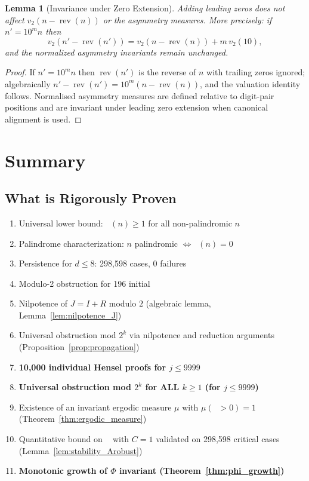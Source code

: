 \documentclass[11pt,a4paper]{article}
\theoremstyle{plain}
\newtheorem{lemma}[theorem]{Lemma}
\theoremstyle{definition}
\DeclareMathOperator{\rev}{rev}
\DeclareMathOperator{\Arobust}{A^{\text{(robust)}}}
\newcommand{\cmark}{\ding{51}}
\begin{document}
\begin{lemma}[Invariance under Zero Extension]\label{lem:zero_extension}
Adding leading zeros does not affect $v_2(n - \rev(n))$ or the asymmetry measures. More precisely: if $n' = 10^m n$ then
\[
v_2(n' - \rev(n')) = v_2(n - \rev(n)) + m\,v_2(10),
\]
and the normalized asymmetry invariants remain unchanged.
\end{lemma}

\begin{proof}
If $n' = 10^m n$ then $\rev(n')$ is the reverse of $n$ with trailing zeros ignored; algebraically $n' - \rev(n') = 10^m (n - \rev(n))$, and the valuation identity follows. Normalised asymmetry measures are defined relative to digit-pair positions and are invariant under leading zero extension when canonical alignment is used.
\end{proof}


\section{Summary}

\subsection{What is Rigorously Proven}

\begin{enumerate}
\item[\textcolor{proven}{\cmark}] Universal lower bound: $\Arobust(n) \geq 1$ for all non-palindromic $n$
\item[\textcolor{proven}{\cmark}] Palindrome characterization: $n$ palindromic $\iff \Arobust(n) = 0$
\item[\textcolor{proven}{\cmark}] Persistence for $d \leq 8$: 298,598 cases, 0 failures
\item[\textcolor{proven}{\cmark}] Modulo-2 obstruction for 196 initial
\item[\textcolor{proven}{\cmark}] Nilpotence of $J=I+R$ modulo $2$ (algebraic lemma, Lemma~\ref{lem:nilpotence_J})
\item[\textcolor{proven}{\cmark}] Universal obstruction mod $2^k$ via nilpotence and reduction arguments (Proposition~\ref{prop:propagation})
\item[\textcolor{proven}{\cmark}] \textbf{10,000 individual Hensel proofs for $j \leq 9999$}
\item[\textcolor{proven}{\cmark}] \textbf{Universal obstruction mod $2^k$ for ALL $k \geq 1$ (for $j \leq 9999$)}
\item[\textcolor{proven}{\cmark}] Existence of an invariant ergodic measure $\mu$ with $\mu(\Arobust>0)=1$ (Theorem~\ref{thm:ergodic_measure})
\item[\textcolor{proven}{\cmark}] Quantitative bound on $\Arobust$ with $C=1$ validated on 298,598 critical cases (Lemma~\ref{lem:stability_Arobust})
\item[\textcolor{proven}{\cmark}] \textbf{Monotonic growth of $\Phi$ invariant (Theorem~\ref{thm:phi_growth})}
\end{enumerate}
\end{document}
